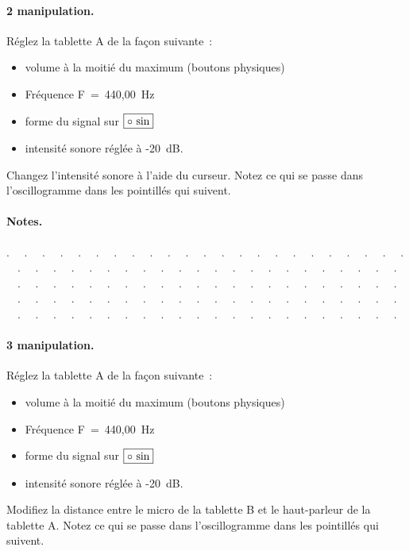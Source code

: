 \documentclass[12pt,a4paper,notitlepage]{article}
\begin{document}
\paragraph{2\ieme{} manipulation.} 
Réglez la tablette A de la façon suivante~:
\begin{itemize}
	\item volume à la moitié du maximum (boutons physiques)
	\item Fréquence F~=~440,00~Hz
	\item forme du signal sur $\boxed{\circ ~ \rm sin}$
	\item intensité sonore réglée à -20~dB.
\end{itemize}
Changez l'intensité sonore à l'aide du curseur. Notez ce qui se passe dans l'oscillogramme dans les pointillés qui suivent.

\paragraph*{Notes.}
. \ \ . \ \ . \ \ . \ \ . \ \ . \ \ . \ \ . \ \ . \ \ . \ \ . \ \ . \ \ . \ \ . \ \ . \ \ . \ \ . \ \ . \ \ . \ \ . \ \ . \ \ . \ \ . \ \ . \ \ . \ \ . \ \ . \ \ . \ \ . \ \ . \ \ . \ \ . \ \ . \ \ . \ \ . \ \ . \ \ . \ \ . \ \ . \ \ . \ \ . \ \ . \ \ . \ \ . \ \ . \ \ . \ \ . \ \ . \ \ . \ \ . \ \ . \ \ . \ \ . \ \ . \ \ . \ \ . \ \ . \ \ . \ \ . \ \ . \ \ . \ \ . \ \ . \ \ . \ \ . \ \ . \ \ . \ \ . \ \ . \ \ . \ \ . \ \ . \ \ . \ \ . \ \ . \ \ . \ \ . \ \ . \ \ . \ \ . \ \ . \ \ . \ \ . \ \ . \ \ . \ \ . \ \ . \ \ . \ \ . \ \ . \ \ . \ \ . \ \ . \ \ . \ \ . \ \ . \ \ . \ \ . \ \ . \ \ . \ \ . \ \ . \ \ . \ \ . \ \ . \ \ . \ \ . \ \ . \ \ . \ \ . \ \ .

\paragraph{3\ieme{} manipulation.} 
Réglez la tablette A de la façon suivante~:
\begin{itemize}
	\item volume à la moitié du maximum (boutons physiques)
	\item Fréquence F~=~440,00~Hz
	\item forme du signal sur $\boxed{\circ ~ \rm sin}$
	\item intensité sonore réglée à -20~dB.
\end{itemize}
Modifiez la distance entre le micro de la tablette B et le haut-parleur de la tablette A. 
Notez ce qui se passe dans l'oscillogramme dans les pointillés qui suivent. 
\end{document}

